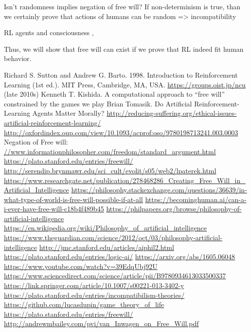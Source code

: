 \documentclass[a4,left=1cm]{article}
\begin{document}
Isn't randomness implies negation of free will? If non-determinism is true, than we certainly prove that actions of humans can be random => incompatibility

RL agents and consciousness \cite{rlmorality1}, \cite{rlmorality2}

Thus, we will show that free will can exist if we prove that RL indeed fit human behavior.

\begin{thebibliography}{20}
 Richard S. Sutton and Andrew G. Barto. 1998. Introduction to Reinforcement Learning (1st ed.). MIT Press, Cambridge, MA, USA.
 \url{https://groups.oist.jp/ncu} (late 2010s)
 Kenneth T. Kishida. A computational approach to “free will” constrained by the games we play
 Brian Tomasik. Do Artificial Reinforcement-Learning Agents Matter Morally?
 \url{http://reducing-suffering.org/ethical-issues-artificial-reinforcement-learning/}
 \url{http://oxfordindex.oup.com/view/10.1093/acprof:oso/9780198713241.003.0003}
 Negation of Free will: \url{//www.informationphilosopher.com/freedom/standard_argument.html}
 \url{https://plato.stanford.edu/entries/freewill/}
 \url{http://serendip.brynmawr.edu/sci_cult/evolit/s05/web2/lpaterek.html}
 \url{https://www.researchgate.net/publication/278468286_Creating_Free_Will_in_Artificial_Intelligence}
 \url{https://philosophy.stackexchange.com/questions/36639/in-what-type-of-world-is-free-will-possible-if-at-all}
 \url{https://becominghuman.ai/can-a-i-ever-have-free-will-c18b4f489b45}
 \url{https://philpapers.org/browse/philosophy-of-artificial-intelligence}
 \url{https://en.wikipedia.org/wiki/Philosophy_of_artificial_intelligence}
 \url{https://www.theguardian.com/science/2012/oct/03/philosophy-artificial-intelligence}
 \url{http://jmc.stanford.edu/articles/aiphil2.html}
 \url{https://plato.stanford.edu/entries/logic-ai/}
 \url{https://arxiv.org/abs/1605.06048}
 \url{https://www.youtube.com/watch?v=39EdqUbj92U}
 \url{https://www.sciencedirect.com/science/article/pii/B9780934613033500337}
 \url{https://link.springer.com/article/10.1007/s00221-013-3402-y}
 \url{https://plato.stanford.edu/entries/incompatibilism-theories/}
 \url{https://github.com/lucasdupin/game_theory_of_life}
 \url{https://plato.stanford.edu/entries/freewill/}
 \url{http://andrewmbailey.com/pvi/van_Inwagen_on_Free_Will.pdf}

\end{thebibliography}
\end{document}

